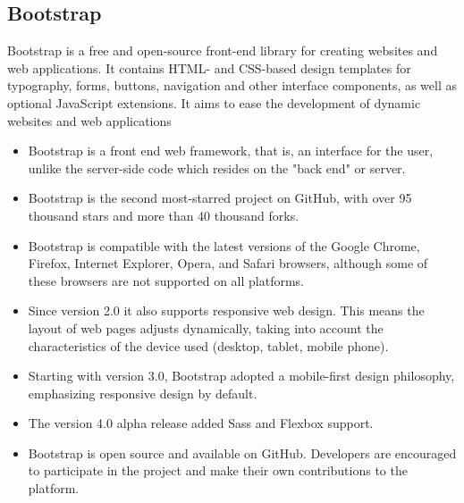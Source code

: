 \subsection{Bootstrap}
\par Bootstrap is a free and open-source front-end library for creating websites and web applications. It contains HTML- and CSS-based design templates for typography, forms, buttons, navigation and other interface components, as well as optional JavaScript extensions. It aims to ease the development of dynamic websites and web applications
\begin{itemize}
\item Bootstrap is a front end web framework, that is, an interface for the user, unlike the server-side code which resides on the "back end" or server.
\item Bootstrap is the second most-starred project on GitHub, with over 95 thousand stars and more than 40 thousand forks.
\item Bootstrap is compatible with the latest versions of the Google Chrome, Firefox, Internet Explorer, Opera, and Safari browsers, although some of these browsers are not supported on all platforms.
\item Since version 2.0 it also supports responsive web design. This means the layout of web pages adjusts dynamically, taking into account the characteristics of the device used (desktop, tablet, mobile phone).
\item Starting with version 3.0, Bootstrap adopted a mobile-first design philosophy, emphasizing responsive design by default.
\item The version 4.0 alpha release added Sass and Flexbox support.
\item Bootstrap is open source and available on GitHub. Developers are encouraged to participate in the project and make their own contributions to the platform.
\end{itemize}

